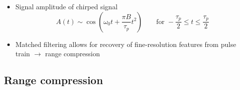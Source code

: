 \documentclass[11pt, oneside]{article}
\begin{document}
\begin{itemize}
	\item[--] Signal amplitude of chirped signal
	\begin{equation}
		\label{e:At}
		A(t) \sim \cos\!\left(\omega_0t + \frac{\pi B}{\tau_p}t^2\right) \qquad \text{for } -\frac{\tau_p}{2} \le t \le \frac{\tau_p}{2}
	\end{equation}
	\item[--] Matched filtering allows for recovery of fine-resolution features from pulse train $\rightarrow$ range compression
\end{itemize}

\subsection{Range compression}
\label{s:rc}
\end{document}
